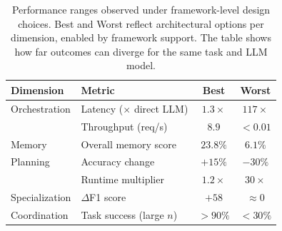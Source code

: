 




\setlength{\tabcolsep}{4.pt}
\begin{table}[t]
\centering
\scriptsize
\renewcommand{\arraystretch}{0.9}
\vspace{1mm}
\caption{Performance ranges observed under framework-level design choices. Best and Worst reflect architectural options per dimension, enabled by framework support. The table shows how far outcomes can diverge for the same task and LLM model.}
\vspace{-1mm}
\label{tab:motivation}
\begin{tabular}{p{2.4cm}p{3.2cm}cc}
\toprule
\textbf{Dimension} & \textbf{Metric} & \textbf{Best} & \textbf{Worst} \\
\midrule
Orchestration
& Latency ($\times$ direct LLM)
& {\color{BestGreen}$1.3\times$}
& {\color{WorstRed}$117\times$} \\
& Throughput (req/s)
& {\color{BestGreen}$8.9$}
& {\color{WorstRed}$<0.01$} \\

\midrule
Memory
& Overall memory score
& {\color{BestGreen}$23.8\%$}
& {\color{WorstRed}$6.1\%$} \\

\midrule
Planning
& Accuracy change
& {\color{BestGreen}$+15\%$}
& {\color{WorstRed}$-30\%$} \\
& Runtime multiplier
& {\color{BestGreen}$1.2\times$}
& {\color{WorstRed}$30\times$} \\

\midrule
Specialization
& $\Delta$F1 score
& {\color{BestGreen}$+58$}
& {\color{WorstRed}$\approx 0$} \\

\midrule
Coordination
& Task success (large $n$)
& {\color{BestGreen}$>90\%$}
& {\color{WorstRed}$<30\%$} \\
\bottomrule
\end{tabular}
\vspace{-3mm}
\end{table}
